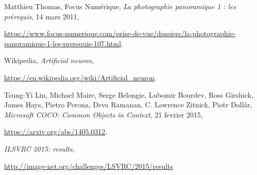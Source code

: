 \begin{thebibliography}{9}
		Matthieu Thomas,
		Focus Numérique,
		\emph{La photographie panoramique 1 : les prérequis},
		14 mars 2011,
		\par
		\url{https://www.focus-numerique.com/prise-de-vue/dossiers/la-photographie-panoramique-1-les-prerequis-107.html}.

		Wikipedia,
		\emph{Artificial neuron},
		\par
		\url{https://en.wikipedia.org/wiki/Artificial_neuron}.

		Tsung-Yi Lin, Michael Maire, Serge Belongie, Lubomir Bourdev, Ross Girshick, James Hays, Pietro Perona, Deva Ramanan, C. Lawrence Zitnick, Piotr Dollár,
		\emph{Microsoft COCO: Common Objects in Context},
		21 fevrier 2015,
		\par
		\url{https://arxiv.org/abs/1405.0312}.

		\emph{ILSVRC 2015: results},
		\par
		\url{http://image-net.org/challenges/LSVRC/2015/results}

\end{thebibliography}
